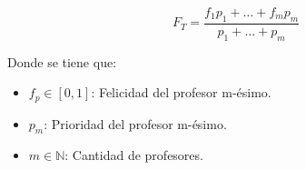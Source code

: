 \begin{equation}
	F_T = \frac{f_1p_1 + \dots + f_mp_m}{p_1 + \dots + p_m}
\end{equation}

\noindent Donde se tiene que:
\begin{itemize}
	\item $f_p \in [0, 1]$: Felicidad del profesor m-ésimo.
	\item $p_m$: Prioridad del profesor m-ésimo.
	\item $m \in \mathbb{N}$: Cantidad de profesores.
\end{itemize}




%
%
